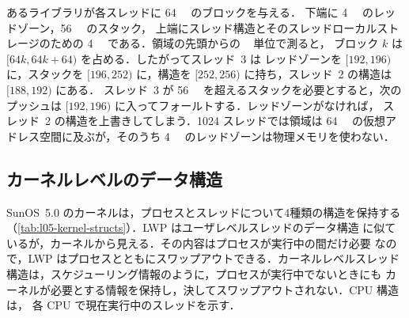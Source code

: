 \documentclass[../main.tex]{subfiles}
\begin{document}
\begin{example}
  あるライブラリが各スレッドに \SI{64}{\kibi\byte} のブロックを与える．
  下端に \SI{4}{\kibi\byte} のレッドゾーン，\SI{56}{\kibi\byte} のスタック，
  上端にスレッド構造とそのスレッドローカルストレージのための
  \SI{4}{\kibi\byte} である．領域の先頭からの \si{\kibi\byte} 単位で測ると，
  ブロック $k$ は $[64k, 64k+64)$ を占める．したがってスレッド~3 は
  レッドゾーンを $[192, 196)$ に，スタックを $[196, 252)$ に，構造を
  $[252, 256)$ に持ち，スレッド~2 の構造は $[188, 192)$ にある．
  スレッド~3 が \SI{56}{\kibi\byte} を超えるスタックを必要とすると，次の
  プッシュは $[192, 196)$ に入ってフォールトする．レッドゾーンがなければ，
  スレッド~2 の構造を上書きしてしまう．1024 スレッドでは領域は
  \SI{64}{\mebi\byte} の仮想アドレス空間に及ぶが，そのうち
  \SI{4}{\mebi\byte} のレッドゾーンは物理メモリを使わない．
\end{example}

\subsection{カーネルレベルのデータ構造}

SunOS~5.0 のカーネルは，プロセスとスレッドについて4種類の構造を保持する
（\cref{tab:l05-kernel-structs}）．LWP はユーザレベルスレッドのデータ構造
に似ているが，カーネルから見える．その内容はプロセスが実行中の間だけ必要
なので，LWP はプロセスとともにスワップアウトできる．カーネルレベルスレッド
構造は，スケジューリング情報のように，プロセスが実行中でないときにも
カーネルが必要とする情報を保持し，決してスワップアウトされない．CPU 構造は，
各 CPU で現在実行中のスレッドを示す．
\end{document}

